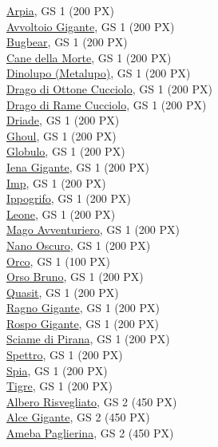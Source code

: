 \begin{multicols}{3}
{\hyperlink{Arpia}{Arpia}, GS 1 (200 PX)\\
\hyperlink{Avvoltoio Gigante}{Avvoltoio Gigante}, GS 1 (200 PX)\\
\hyperlink{Bugbear}{Bugbear}, GS 1 (200 PX)\\
\hyperlink{Cane della Morte}{Cane della Morte}, GS 1 (200 PX)\\
\hyperlink{Dinolupo (Metalupo)}{Dinolupo (Metalupo)}, GS 1 (200 PX)\\
\hyperlink{Drago di Ottone Cucciolo}{Drago di Ottone Cucciolo}, GS 1 (200 PX)\\
\hyperlink{Drago di Rame Cucciolo}{Drago di Rame Cucciolo}, GS 1 (200 PX)\\
\hyperlink{Driade}{Driade}, GS 1 (200 PX)\\
\hyperlink{Ghoul}{Ghoul}, GS 1 (200 PX)\\
\hyperlink{Globulo}{Globulo}, GS 1 (200 PX)\\
\hyperlink{Iena Gigante}{Iena Gigante}, GS 1 (200 PX)\\
\hyperlink{Imp}{Imp}, GS 1 (200 PX)\\
\hyperlink{Ippogrifo}{Ippogrifo}, GS 1 (200 PX)\\
\hyperlink{Leone}{Leone}, GS 1 (200 PX)\\
\hyperlink{Mago Avventuriero}{Mago Avventuriero}, GS 1 (200 PX)\\
\hyperlink{Nano Oscuro}{Nano Oscuro}, GS 1 (200 PX)\\
\hyperlink{Orco}{Orco}, GS 1 (100 PX)\\
\hyperlink{Orso Bruno}{Orso Bruno}, GS 1 (200 PX)\\
\hyperlink{Quasit}{Quasit}, GS 1 (200 PX)\\
\hyperlink{Ragno Gigante}{Ragno Gigante}, GS 1 (200 PX)\\
\hyperlink{Rospo Gigante}{Rospo Gigante}, GS 1 (200 PX)\\
\hyperlink{Sciame di Pirana}{Sciame di Pirana}, GS 1 (200 PX)\\
\hyperlink{Spettro}{Spettro}, GS 1 (200 PX)\\
\hyperlink{Spia}{Spia}, GS 1 (200 PX)\\
\hyperlink{Tigre}{Tigre}, GS 1 (200 PX)\\
\hyperlink{Albero Risvegliato}{Albero Risvegliato}, GS 2 (450 PX)\\
\hyperlink{Alce Gigante}{Alce Gigante}, GS 2 (450 PX)\\
\hyperlink{Ameba Paglierina}{Ameba Paglierina}, GS 2 (450 PX)\\
}
\end{multicols}
